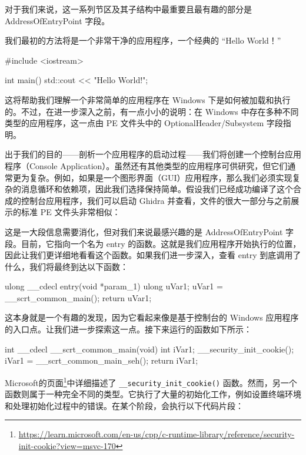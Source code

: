 对于我们来说，这一系列节区及其子结构中最重要且最有趣的部分是 AddressOfEntryPoint 字段。


我们最初的方法将是一个非常干净的应用程序，一个经典的 “Hello World！”

\begin{cpp}
#include <iostream>

int main() {
  std::cout << "Hello World!\n";
}
\end{cpp}

这将帮助我们理解一个非常简单的应用程序在 Windows 下是如何被加载和执行的。不过，在进一步深入之前，有一点小小的说明：在 Windows 中存在多种不同类型的应用程序，这一点由 PE 文件头中的 OptionalHeader/Subsystem 字段指明。

出于我们的目的——剖析一个应用程序的启动过程——我们将创建一个控制台应用程序（Console Application）。虽然还有其他类型的应用程序可供研究，但它们通常更为复杂。例如，如果是一个图形界面（GUI）应用程序，那么我们必须实现复杂的消息循环和依赖项，因此我们选择保持简单。假设我们已经成功编译了这个合成的控制台应用程序，我们可以启动 Ghidra 并查看，文件的很大一部分与之前展示的标准 PE 文件头非常相似：


这是一大段信息需要消化，但对我们来说最感兴趣的是 AddressOfEntryPoint 字段。目前，它指向一个名为 entry 的函数。这就是我们应用程序开始执行的位置，因此让我们更详细地看看这个函数。如果我们进一步深入，查看 entry 到底调用了什么，我们将最终到达以下函数：

\begin{cpp}
ulong __cdecl entry(void *param_1) {
  ulong uVar1;
  uVar1 = __scrt_common_main();
  return uVar1;
}
\end{cpp}

这本身就是一个有趣的发现，因为它看起来像是基于控制台的 Windows 应用程序的入口点。让我们进一步探索这一点。接下来运行的函数如下所示：

\begin{cpp}
int __cdecl __scrt_common_main(void) {
  int iVar1;
  __security_init_cookie();
  iVar1 = __scrt_common_main_seh();
  return iVar1;
}
\end{cpp}

Microsoft的页面\footnote{\url{https://learn.microsoft.com/en-us/cpp/c-runtime-library/reference/security-init-cookie?view=msvc-170}}中详细描述了 \verb|__security_init_cookie()| 函数。然而，另一个函数则属于一种完全不同的类型。它执行了大量的初始化工作，例如设置终端环境和处理初始化过程中的错误。在某个阶段，会执行以下代码片段：


